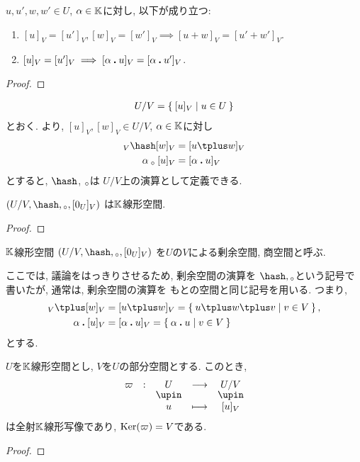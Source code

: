 \begin{lemma}
\label{lem:quotientspace:well:def}
  $u,u',w,w'\in U$, $\alpha \in \mathbb{K}$に対し, 以下が成り立つ:  
  \begin{enumerate}
  \item $[u]_V=[u']_V, [w]_V=[w']_V \implies [u\plus w]_V=[u'\plus w']_V$.
  \item $[u]_V=[u']_V \implies [\alpha\mathbin{\boldsymbol{.}} u]_V=[\alpha\mathbin{\boldsymbol{.}} u']_V$.
  \end{enumerate}
\end{lemma}
\begin{proof}\end{proof}

\begin{align*}
  U/V=\Set{[u]_V|u\in U}
\end{align*}
とおく.
より,
$[u]_V,[w]_V\in U/V$, $\alpha\in\mathbb{K}$に対し
\begin{align*}
[u]_V\pplus [w]_V &= [u\plus w]_V\\
\alpha\aact [u]_V &= [\alpha\act u]_V
\end{align*}
とすると,
$\pplus$, $\mathbin{{}_\circ}$は
$U/V$上の演算として定義できる.
\begin{lemma}
  $(U/V,\pplus,\aact,[0_U]_V)$
  は$\mathbb{K}$線形空間.
\end{lemma}
\begin{proof}\end{proof}
\begin{definition}
  $\mathbb{K}$線形空間
  $(U/V,\pplus,\aact,[0_U]_V)$
  を$U$の$V$による剰余空間, 商空間と呼ぶ.
\end{definition}

\begin{remark}
  ここでは,
  議論をはっきりさせるため,
  剰余空間の演算を
  $\pplus,\aact$という記号で書いたが,
  通常は,
  剰余空間の演算を
  もとの空間と同じ記号を用いる.
  つまり,
  \begin{align*}
    [u]_V\plus [w]_V&=[u \plus w]_V=\Set{u \plus w \plus v|v\in V}, \\
    \alpha \act [u]_V&=[\alpha \act u]_V=\Set{\alpha\act u|v\in V}
  \end{align*}
  とする.
\end{remark}

\begin{prop}
$U$を$\mathbb{K}$線形空間とし,
$V$を$U$の部分空間とする.
このとき,
\begin{align*}
\shazo{\varpi}{U}{U/V}
{u}{[u]_V}
\end{align*}
は全射$\mathbb{K}$線形写像であり,
$\operatorname{Ker}(\varpi)=V$である.
\end{prop}
\begin{proof}\end{proof}


